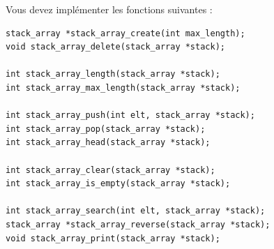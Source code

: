 
\noindent Vous devez implémenter les fonctions suivantes :

\bigskip

\lstset{language=C}
\begin{lstlisting}[frame=single,title={Liste des fonctions pour une pile avec liste chaînée}]
stack_array *stack_array_create(int max_length);
void stack_array_delete(stack_array *stack);

int stack_array_length(stack_array *stack);
int stack_array_max_length(stack_array *stack);

int stack_array_push(int elt, stack_array *stack);
int stack_array_pop(stack_array *stack);
int stack_array_head(stack_array *stack);

int stack_array_clear(stack_array *stack);
int stack_array_is_empty(stack_array *stack);

int stack_array_search(int elt, stack_array *stack);
stack_array *stack_array_reverse(stack_array *stack);
void stack_array_print(stack_array *stack);
\end{lstlisting}


\subsubsection*{}

